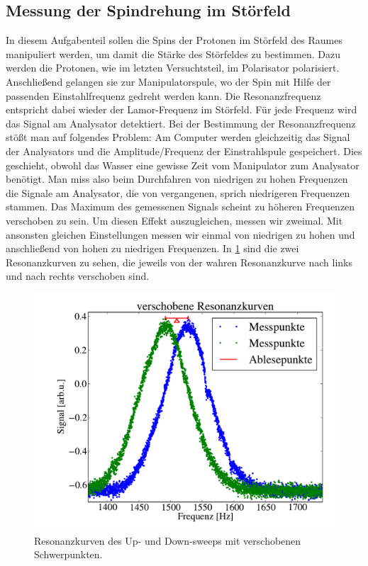 \documentclass[paper=a4,
	fontsize=10pt,
	DIV=18,
	twocolumn,
	parskip=half
	]{scrartcl}
\numberwithin{equation}{section}    %
\begin{document}
\subsection{Messung der Spindrehung im Störfeld}
\label{auswertung5}
In diesem Aufgabenteil sollen die Spins der Protonen im Störfeld des Raumes manipuliert werden, um damit die Stärke des Störfeldes zu bestimmen.
Dazu werden die Protonen, wie im letzten Versuchtsteil, im Polarisator polarisiert.
Anschließend gelangen sie zur Manipulatorspule, wo der Spin mit Hilfe der passenden Einstahlfrequenz gedreht werden kann.
Die Resonanzfrequenz entspricht dabei wieder der Lamor-Frequenz im Störfeld.
Für jede Frequenz wird das Signal am Analysator detektiert.
Bei der Bestimmung der Resonanzfrequenz stößt man auf folgendes Problem:
Am Computer werden gleichzeitig das Signal der Analysators und die Amplitude/Frequenz der Einstrahlspule gespeichert.
Dies geschieht, obwohl das Wasser eine gewisse Zeit vom Manipulator zum Analysator benötigt.
Man miss also beim Durchfahren von niedrigen zu hohen Frequenzen die Signale am Analysator, die von vergangenen, sprich niedrigeren Frequenzen stammen.
Das Maximum des gemessenen Signals scheint zu höheren Frequenzen verschoben zu sein.
Um diesen Effekt auszugleichen, messen wir zweimal. 
Mit ansonsten gleichen Einstellungen messen wir einmal von niedrigen zu hohen und anschließend von hohen zu niedrigen Frequenzen.
In \cref{gewichte} sind die zwei Resonanzkurven zu sehen, die jeweils von der wahren Resonanzkurve nach links und nach rechts verschoben sind.
\begin{figure}[htp]
	\begin{center}
		\includegraphics[width=\columnwidth]{Data-Plots/05-Resonanzfrequenz.pdf}
		\caption{Resonanzkurven des Up- und Down-sweeps mit verschobenen Schwerpunkten.}
		\label{gewichte}
	\end{center}
\end{figure}
\end{document}
